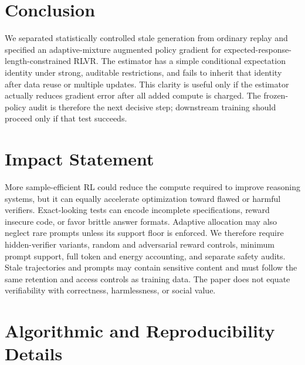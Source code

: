 \documentclass{article}
\begin{document}
\section{Conclusion}
\label{sec:conclusion}

We separated statistically controlled stale generation from ordinary replay
and specified an adaptive-mixture augmented policy gradient for
expected-response-length-constrained RLVR. The estimator has a simple
conditional expectation identity under
strong, auditable restrictions, and fails to inherit that identity after data
reuse or multiple updates. This clarity is useful only if the estimator
actually reduces gradient error after all added compute is charged. The
frozen-policy audit is therefore the next decisive step; downstream training
should proceed only if that test succeeds.


\section*{Impact Statement}

More sample-efficient RL could reduce the compute required to improve
reasoning systems, but it can equally accelerate optimization toward flawed or
harmful verifiers. Exact-looking tests can encode incomplete specifications,
reward insecure code, or favor brittle answer formats. Adaptive allocation may
also neglect rare prompts unless its support floor is enforced. We therefore
require hidden-verifier variants, random and adversarial reward controls,
minimum prompt support, full token and energy accounting, and separate safety
audits. Stale trajectories and prompts may contain sensitive content and must
follow the same retention and access controls as training data. The paper does
not equate verifiability with correctness, harmlessness, or social value.




\clearpage
\appendix
\onecolumn

\section{Algorithmic and Reproducibility Details}
\label{app:algorithm}
\end{document}
